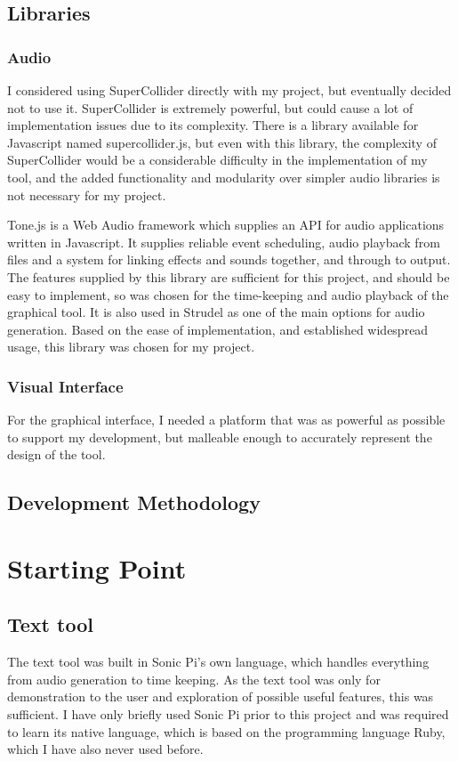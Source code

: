 \documentclass[12pt,a4paper,twoside,openright]{report}
\begin{document}
\subsection{Libraries}
\subsubsection{Audio}
I considered using SuperCollider directly with my project, but eventually decided not to use it. SuperCollider is extremely powerful, but could cause a lot of implementation issues due to its complexity. There is a library available for Javascript named supercollider.js, but even with this library, the complexity of SuperCollider would be a considerable difficulty in the implementation of my tool, and the added functionality and modularity over simpler audio libraries is not necessary for my project.

Tone.js is a Web Audio framework which supplies an API for audio applications written in Javascript. It supplies reliable event scheduling, audio playback from files and a system for linking effects and sounds together, and through to output. The features supplied by this library are sufficient for this project, and should be easy to implement, so was chosen for the time-keeping and audio playback of the graphical tool. It is also used in Strudel as one of the main options for audio generation. Based on the ease of implementation, and established widespread usage, this library was chosen for my project.

\subsubsection{Visual Interface}
For the graphical interface, I needed a platform that was as powerful as possible to support my development, but malleable enough to accurately represent the design of the tool.


\subsection{Development Methodology}

\section{Starting Point}
\subsection{Text tool}
The text tool was built in Sonic Pi's own language, which handles everything from audio generation to time keeping. As the text tool was only for demonstration to the user and exploration of possible useful features, this was sufficient. I have only briefly used Sonic Pi prior to this project and was required to learn its native language, which is based on the programming language Ruby, which I have also never used before.
\end{document}
